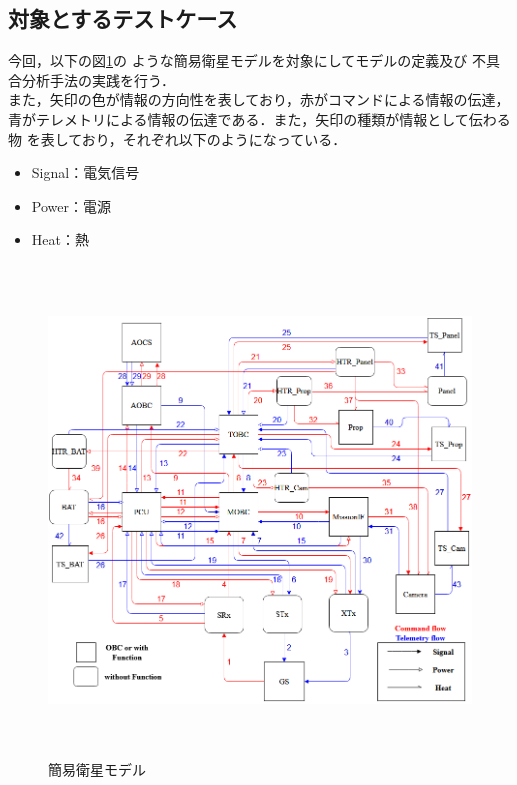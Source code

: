 \documentclass[11pt]{jsreport}
\begin{document}
\subsection{対象とするテストケース}
今回，以下の図\ref{fig:simple_sat}の
ような簡易衛星モデルを対象にしてモデルの定義及び
不具合分析手法の実践を行う．\\
また，矢印の色が情報の方向性を表しており，赤がコマンドによる情報の伝達，
青がテレメトリによる情報の伝達である．また，矢印の種類が情報として伝わる物
を表しており，それぞれ以下のようになっている．
\begin{itemize}
   \item Signal：電気信号
   \item Power：電源
   \item Heat：熱
\end{itemize}
\begin{figure}[H]
   \centering
      \includegraphics[height=13.0cm]{figure/satellite_diagram.png}
      \caption{簡易衛星モデル}
      \label{fig:simple_sat}
\end{figure}
\end{document}
